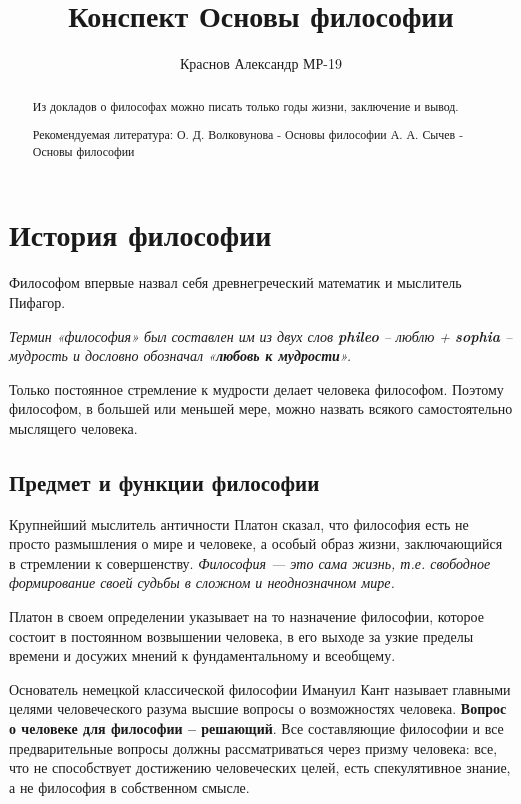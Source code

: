 \documentclass[
]{article}
\title{Конспект Основы философии}
\author{Краснов Александр МР-19}
\date{}
\begin{document}
\maketitle
\begin{abstract}
Из докладов о философах можно писать только годы жизни, заключение и
вывод.

Рекомендуемая литература: О. Д. Волковунова - Основы философии А. А.
Сычев - Основы философии
\end{abstract}

\hypertarget{ux438ux441ux442ux43eux440ux438ux44f-ux444ux438ux43bux43eux441ux43eux444ux438ux438}{%
\section{История
философии}\label{ux438ux441ux442ux43eux440ux438ux44f-ux444ux438ux43bux43eux441ux43eux444ux438ux438}}

Философом впервые назвал себя древнегреческий математик и мыслитель
Пифагор.

\emph{Термин «философия» был составлен им из двух слов \textbf{phileo}
-- люблю + \textbf{sophia} -- мудрость и дословно обозначал
«\textbf{любовь к мудрости}».}

Только постоянное стремление к мудрости делает человека философом.
Поэтому философом, в большей или меньшей мере, можно назвать всякого
самостоятельно мыслящего человека.

\hypertarget{ux43fux440ux435ux434ux43cux435ux442-ux438-ux444ux443ux43dux43aux446ux438ux438-ux444ux438ux43bux43eux441ux43eux444ux438ux438}{%
\subsection{Предмет и функции
философии}\label{ux43fux440ux435ux434ux43cux435ux442-ux438-ux444ux443ux43dux43aux446ux438ux438-ux444ux438ux43bux43eux441ux43eux444ux438ux438}}

Крупнейший мыслитель античности Платон сказал, что философия есть не
просто размышления о мире и человеке, а особый образ жизни,
заключающийся в стремлении к совершенству. \emph{Философия --- это сама
жизнь, т.е. свободное формирование своей судьбы в сложном и
неоднозначном мире.}

Платон в своем определении указывает на то назначение философии, которое
состоит в постоянном возвышении человека, в его выходе за узкие пределы
времени и досужих мнений к фундаментальному и всеобщему.

Основатель немецкой классической философии Имануил Кант называет
главными целями человеческого разума высшие вопросы о возможностях
человека. \textbf{Вопрос о человеке для философии -- решающий}. Все
составляющие философии и все предварительные вопросы должны
рассматриваться через призму человека: все, что не способствует
достижению человеческих целей, есть спекулятивное знание, а не философия
в собственном смысле.
\end{document}
